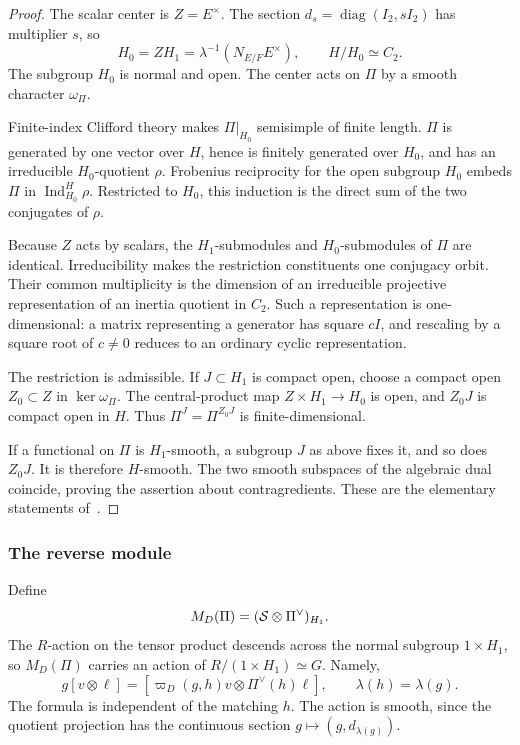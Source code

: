 \begin{proof}
The scalar center is \(Z=E^\times\). The section
\(d_s=\operatorname{diag}(I_2,sI_2)\) has multiplier \(s\), so
\[
 H_0=ZH_1=\lambda^{-1}(N_{E/F}E^\times),\qquad H/H_0\simeq C_2.
\]
The subgroup \(H_0\) is normal and open. The center acts on \(\Pi\)
by a smooth character \(\omega_\Pi\).

Finite-index Clifford theory makes \(\Pi|_{H_0}\) semisimple of
finite length. \(\Pi\) is generated by one vector
over \(H\), hence is finitely generated over \(H_0\), and has an
irreducible \(H_0\)-quotient \(\rho\). Frobenius reciprocity for the
open subgroup \(H_0\) embeds \(\Pi\) in
\(\operatorname{Ind}_{H_0}^H\rho\). Restricted to \(H_0\), this
induction is the direct sum of the two conjugates of \(\rho\).

Because \(Z\) acts by scalars, the \(H_1\)-submodules and
\(H_0\)-submodules of \(\Pi\) are identical. Irreducibility makes
the restriction constituents one conjugacy orbit. Their common
multiplicity is the dimension of an irreducible projective
representation of an inertia quotient in \(C_2\). Such a
representation is one-dimensional: a matrix representing a
generator has square \(cI\), and rescaling by a square root of
\(c\ne0\) reduces to an ordinary cyclic representation.

The restriction is admissible. If \(J\subset H_1\) is compact open,
choose a compact open \(Z_0\subset Z\) in \(\ker\omega_\Pi\).
The central-product map \(Z\times H_1\to H_0\) is open, and
\(Z_0J\) is compact open in \(H\). Thus
\(\Pi^J=\Pi^{Z_0J}\) is finite-dimensional.

If a functional on \(\Pi\) is \(H_1\)-smooth, a subgroup \(J\) as
above fixes it, and so does \(Z_0J\). It is therefore \(H\)-smooth.
The two smooth subspaces of the algebraic dual coincide, proving
the assertion about contragredients. These are the elementary statements of~\cite[Lemmas~5.2--5.3, \S9]{BGS}.
\end{proof}

\subsubsection{The reverse module}

Define
\[
 M_D(\Pi)=(\mathcal S\otimes\Pi^\vee)_{H_1}.
\]
The \(R\)-action on the tensor product descends across the normal
subgroup \(1\times H_1\), so \(M_D(\Pi)\) carries an action of
\(R/(1\times H_1)\simeq G\). Namely,
\begin{equation}\label{fun:matching-action}
 g[v\otimes\ell]=[\varpi_D(g,h)v\otimes\Pi^\vee(h)\ell],
 \qquad \lambda(h)=\lambda(g).
\end{equation}
The formula is independent of the matching \(h\). The action is
smooth, since the quotient projection has the continuous section
\(g\mapsto(g,d_{\lambda(g)})\).

